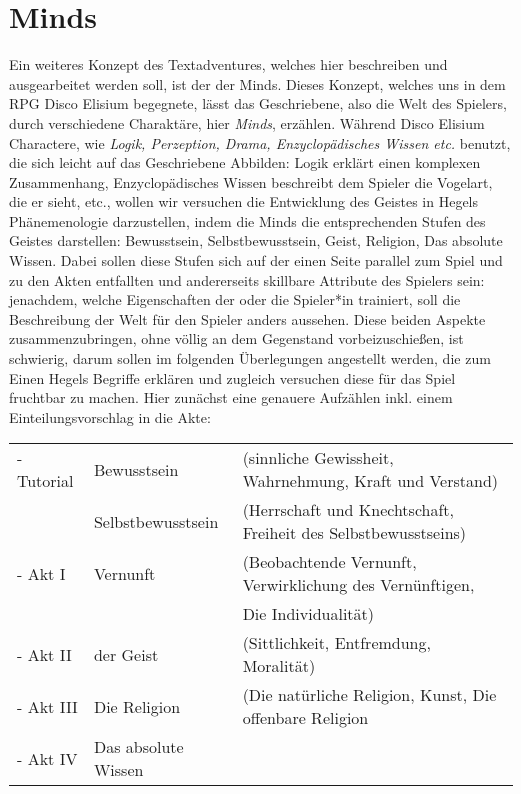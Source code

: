 \documentclass[12pt, a4paper, openany]{report}
\begin{document}
\section{Minds}\label{minds}
Ein weiteres Konzept des Textadventures, welches hier beschreiben und ausgearbeitet werden soll, ist der der \glqq Minds\grqq{}.
Dieses Konzept, welches uns in dem RPG \glqq Disco Elisium\grqq{} begegnete, lässt das Geschriebene, also die Welt des Spielers, durch verschiedene Charaktäre, hier \textit{Minds}, erzählen.
Während Disco Elisium Charactere, wie \textit{Logik, Perzeption, Drama, Enzyclopädisches Wissen etc.} benutzt, die sich leicht auf das Geschriebene Abbilden: Logik erklärt einen komplexen Zusammenhang, Enzyclopädisches Wissen beschreibt dem Spieler die Vogelart, die er sieht, etc., wollen wir versuchen die Entwicklung des Geistes in Hegels Phänemenologie darzustellen, indem die Minds die entsprechenden Stufen des Geistes darstellen: Bewusstsein, Selbstbewusstsein, Geist, Religion, Das absolute Wissen.
Dabei sollen diese Stufen sich auf der einen Seite parallel zum Spiel und zu den Akten entfallten und andererseits skillbare Attribute des Spielers sein:
jenachdem, welche Eigenschaften der oder die Spieler*in trainiert, soll die Beschreibung der Welt für den Spieler anders aussehen. 
Diese beiden Aspekte zusammenzubringen, ohne völlig an dem Gegenstand vorbeizuschießen, ist schwierig, darum sollen im folgenden Überlegungen angestellt werden, die zum Einen Hegels Begriffe erklären und zugleich versuchen diese für das Spiel fruchtbar zu machen. 
Hier zunächst eine genauere Aufzählen inkl. einem Einteilungsvorschlag in die Akte: \\

\begin{tabular}[t] {l l l}
    - Tutorial & Bewusstsein & (sinnliche Gewissheit, Wahrnehmung, Kraft und Verstand) \\
    & Selbstbewusstsein & (Herrschaft und Knechtschaft, Freiheit des Selbstbewusstseins) \\
    - Akt I & Vernunft & (Beobachtende Vernunft, Verwirklichung des Vernünftigen, \\
    & & Die Individualität) \\
    - Akt II & der Geist & (Sittlichkeit, Entfremdung, Moralität) \\
    - Akt III& Die Religion & (Die natürliche Religion, Kunst, Die offenbare Religion \\
    - Akt IV & Das absolute Wissen &
\end{tabular}
\\  
\end{document}
